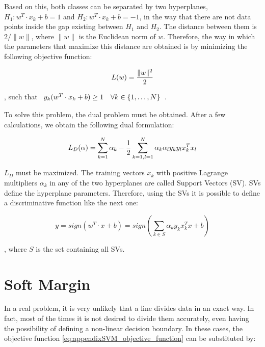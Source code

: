 Based on this, both classes can be separated by two hyperplanes, $H_1: w^T \cdot x_k + b = 1$ and $H_2: w^T \cdot x_k + b = -1$, in the way that there are not data points inside the gap existing between $H_1$ and $H_2$. The distance between them is $2 / \|w\|$, where $\|w\|$ is the Euclidean norm of $w$. Therefore, the way in which the parameters that maximize this distance are obtained is by minimizing the following objective function:

\begin{equation}\label{eq:appendixSVM_objective_function}
 L(w) = {{\|w\|^2} \over 2}
\end{equation}

, such that $\begin{array}{l r} 
y_k (w^T \cdot x_k + b) \geq 1 & \forall k \in \{1, \dots, N \}
\end{array} $.

To solve this problem, the dual problem must be obtained. After a few calculations, we obtain the following dual formulation:

\begin{equation}\label{eq:appendixSVM_dual_formulation}
 L_D (\alpha) = \sum_{k=1}^N \alpha_k - {1 \over 2} \sum_{k = 1, l=1}^N \alpha_k \alpha_l y_k y_l x_k^T x_l
\end{equation}

$L_D$ must be maximized. The training vectors $x_k$ with positive Lagrange multipliers $\alpha_k$ in any of the two hyperplanes are called Support Vectors (SV). SVs define the hyperplane parameters. Therefore, using the SVs it is possible to define a discriminative function like the next one: 

\begin{equation}\label{eq:appendixSVM_discriminative_function}
 y = sign(w^T \cdot x + b) = sign \left(\sum_{k \in S} \alpha_k y_k x_k^T x + b \right)
\end{equation}

, where $S$ is the set containing all SVs.

\section{Soft Margin}\label{ch:appendixSVM_02}

In a real problem, it is very unlikely that a line divides data in an exact way. In fact, most of the times it is not desired to divide them accurately, even having the possibility of defining a non-linear decision boundary. 
In these cases, the objective function \ref{eq:appendixSVM_objective_function} can be substituted by:

